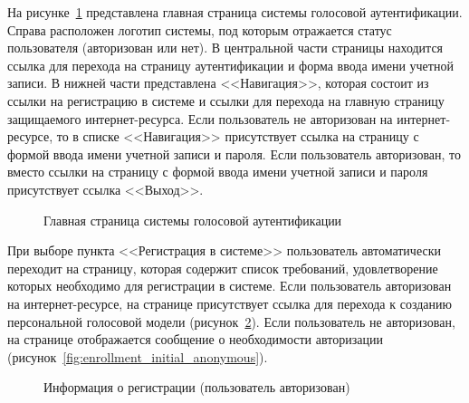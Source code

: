 \label{sec:workorder}

На рисунке~\ref{fig:main_page} представлена главная страница системы голосовой аутентификации. Справа расположен логотип системы, под которым отражается статус пользователя (авторизован или нет). В центральной части страницы находится ссылка для перехода на страницу аутентификации и форма ввода имени учетной записи.
В нижней части представлена <<Навигация>>, которая состоит из ссылки на регистрацию в системе и ссылки для перехода на главную страницу защищаемого интернет-ресурса. Если пользователь не авторизован на интернет-ресурсе, то в списке <<Навигация>> присутствует ссылка на страницу с формой ввода имени учетной записи и пароля. Если пользователь авторизован, то вместо ссылки на страницу с формой ввода имени учетной записи и пароля присутствует ссылка <<Выход>>.

\begin{figure}[hbt!]
\caption{Главная страница системы голосовой аутентификации}
\label{fig:main_page}
\end{figure}

При выборе пункта <<Регистрация в системе>> пользователь автоматически переходит на страницу, которая содержит список требований, удовлетворение которых необходимо для регистрации в системе. Если пользователь авторизован на интернет-ресурсе, на странице присутствует ссылка для перехода к созданию персональной голосовой модели (рисунок~\ref{fig:enrollment_initial_authentificated}). Если пользователь не авторизован, на странице отображается сообщение о необходимости авторизации (рисунок~\ref{fig:enrollment_initial_anonymous}).

\begin{figure}[hbt!]
\caption{Информация о регистрации (пользователь авторизован)}
\label{fig:enrollment_initial_authentificated}
\end{figure}

